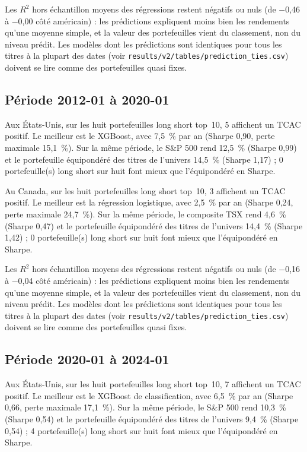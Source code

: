 Les $R^2$ hors échantillon moyens des régressions restent négatifs ou nuls (de $-$0,46 à $-$0,00 côté américain) : les prédictions expliquent moins bien les rendements qu'une moyenne simple, et la valeur des portefeuilles vient du classement, non du niveau prédit. Les modèles dont les prédictions sont identiques pour tous les titres à la plupart des dates (voir \texttt{results/v2/tables/prediction\_ties.csv}) doivent se lire comme des portefeuilles quasi fixes.

\subsection*{Période 2012-01 à 2020-01}

Aux États-Unis, sur les huit portefeuilles long short top~10, 5 affichent un TCAC positif. Le meilleur est le XGBoost, avec 7,5~\% par an (Sharpe 0,90, perte maximale 15,1~\%). Sur la même période, le S\&P 500 rend 12,5~\% (Sharpe 0,99) et le portefeuille équipondéré des titres de l'univers 14,5~\% (Sharpe 1,17) ; 0 portefeuille(s) long short sur huit font mieux que l'équipondéré en Sharpe.

Au Canada, sur les huit portefeuilles long short top~10, 3 affichent un TCAC positif. Le meilleur est la régression logistique, avec 2,5~\% par an (Sharpe 0,24, perte maximale 24,7~\%). Sur la même période, le composite TSX rend 4,6~\% (Sharpe 0,47) et le portefeuille équipondéré des titres de l'univers 14,4~\% (Sharpe 1,42) ; 0 portefeuille(s) long short sur huit font mieux que l'équipondéré en Sharpe.

Les $R^2$ hors échantillon moyens des régressions restent négatifs ou nuls (de $-$0,16 à $-$0,04 côté américain) : les prédictions expliquent moins bien les rendements qu'une moyenne simple, et la valeur des portefeuilles vient du classement, non du niveau prédit. Les modèles dont les prédictions sont identiques pour tous les titres à la plupart des dates (voir \texttt{results/v2/tables/prediction\_ties.csv}) doivent se lire comme des portefeuilles quasi fixes.

\subsection*{Période 2020-01 à 2024-01}

Aux États-Unis, sur les huit portefeuilles long short top~10, 7 affichent un TCAC positif. Le meilleur est le XGBoost de classification, avec 6,5~\% par an (Sharpe 0,66, perte maximale 17,1~\%). Sur la même période, le S\&P 500 rend 10,3~\% (Sharpe 0,54) et le portefeuille équipondéré des titres de l'univers 9,4~\% (Sharpe 0,54) ; 4 portefeuille(s) long short sur huit font mieux que l'équipondéré en Sharpe.


